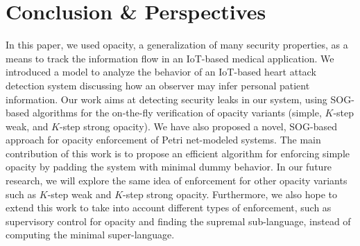 \section{Conclusion  \& Perspectives}
In this paper, we used opacity, a generalization of many security properties, as a means to track the information flow in an IoT-based medical application. We introduced a model to analyze the behavior of an IoT-based heart attack detection system discussing how an observer may infer personal patient information. Our work aims at detecting security leaks in our system, using SOG-based algorithms for the on-the-fly verification of opacity variants (simple, $K$-step weak, and $K$-step strong opacity). We have also proposed a novel, SOG-based approach for opacity enforcement of Petri net-modeled systems. The main contribution of this work is to propose an efficient algorithm for enforcing simple opacity by padding the system with minimal dummy behavior. In our future research, we will explore the same idea of enforcement for other opacity variants such as $K$-step weak and $K$-step strong opacity. Furthermore, we also hope to extend this work to take into account different types of enforcement, such as supervisory control for opacity and finding the supremal sub-language, instead of computing the minimal super-language.